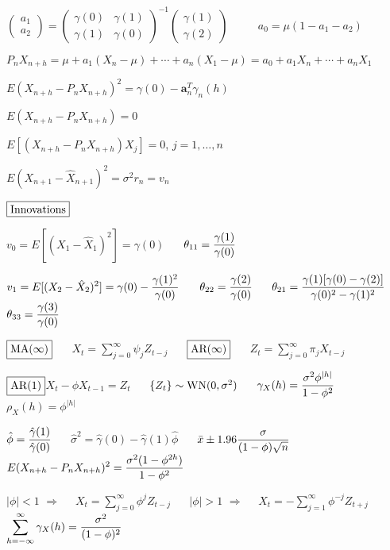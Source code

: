 \documentclass[12pt]{article}
\begin{document}
$\displaystyle
\begin{pmatrix}
a_1\\
a_2
\end{pmatrix}
=
\begin{pmatrix}
\gamma(0) & \gamma(1)\\
\gamma(1) & \gamma(0)
\end{pmatrix}^{-1}
\begin{pmatrix}
\gamma(1)\\
\gamma(2)
\end{pmatrix}
$
$\qquad$
$\displaystyle
a_0=\mu(1-a_1-a_2)
$

$\displaystyle
P_nX_{n+h}=\mu+a_1(X_n-\mu)+\cdots+a_n(X_1-\mu)
=
a_0+a_1X_n+\cdots+a_nX_1
$

$E(X_{n+h}-P_nX_{n+h})^2=\gamma(0)-\mathbf a_n^T\gamma_n(h)$

$E(X_{n+h}-P_nX_{n+h})=0$

$E[(X_{n+h}-P_nX_{n+h})X_j]=0$, $j=1,\ldots,n$

$E(X_{n+1}-\hat X_{n+1})^2=\sigma^2r_n=v_n$


$\boxed{\hbox{Innovations}}$

$v_0=E[(X_1-\hat X_1)^2]=\gamma(0)$
$\quad$
$\displaystyle\theta_{11}={\gamma(1)\over\gamma(0)}$

$\displaystyle v_1=E[(X_2-\hat X_2)^2]=\gamma(0)-{\gamma(1)^2\over\gamma(0)}$
$\quad$
$\displaystyle\theta_{22}={\gamma(2)\over\gamma(0)}$
$\quad$
$\displaystyle\theta_{21}=
{\gamma(1)[\gamma(0)-\gamma(2)]\over\gamma(0)^2-\gamma(1)^2}$
$\quad$
$\displaystyle
\theta_{33}={\gamma(3)\over\gamma(0)}$




$\boxed{\hbox{MA($\infty$)}}$
$\quad$
$\displaystyle
X_t=\sum_{j=0}^\infty\psi_jZ_{t-j}$
$\quad$
$\boxed{\hbox{AR($\infty$)}}$
$\quad$
$\displaystyle
Z_t=\sum_{j=0}^\infty \pi_jX_{t-j}$


$\boxed{\hbox{AR(1)}}
$\quad$
X_t-\phi X_{t-1}=Z_t$
$\quad$
$\{Z_t\}\sim{\rm WN}(0,\sigma^2)$
$\quad$
$\displaystyle
\gamma_X(h)={\sigma^2\phi^{|h|}\over1-\phi^2}$
$\quad$
$\rho_X(h)=\phi^{|h|}$

$\displaystyle
\hat\phi={\hat\gamma(1)\over\hat\gamma(0)}$
$\quad$
$\hat\sigma^2=\hat\gamma(0)-\hat\gamma(1)\hat\phi$
$\quad$
$\displaystyle\bar x\pm1.96{\sigma\over(1-\phi)\sqrt{n}}$
$\quad$
$\displaystyle
E(X_{n+h}-P_nX_{n+h})^2={\sigma^2(1-\phi^{2h})\over1-\phi^2}$

$|\phi|<1$
$\Rightarrow\quad$
$\displaystyle
X_t=\sum_{j=0}^\infty\phi^jZ_{t-j}$
$\quad$
$|\phi|>1$
$\Rightarrow\quad$
$\displaystyle
X_t=-\sum_{j=1}^\infty\phi^{-j}Z_{t+j}$
$\quad$
$\displaystyle
\sum_{h=-\infty}^\infty\gamma_X(h)={\sigma^2\over(1-\phi)^2}$
\end{document}
